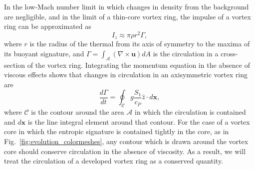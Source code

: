 \documentclass[twocolumn, amsmath, amsfonts, amssymb, trackchanges]{aastex62}
\newcommand{\grad}{\ensuremath{\nabla}}
\begin{document}
In the low-Mach number limit in which changes in density from the background are negligible, and in the limit of a thin-core vortex ring, the impulse of a vortex ring can be approximated as
\begin{equation}
I_z \approx \pi \rho r^2 \Gamma,
\label{eqn:impulse_approx}
\end{equation}
where $r$ is the radius of the thermal from its axis of symmetry to the maxima of its buoyant signature, and $\Gamma = \int_{\mathcal{A}} (\grad\times\bm{u})dA$ is the circulation in a cross-section of the vortex ring.
Integrating the momentum equation in the absence of viscous effects shows that changes in circulation in an axisymmetric vortex ring are
\begin{equation}
\frac{d\Gamma}{dt} = \oint_{\mathcal{C}} g \frac{S_1}{c_P}\hat{z} \cdot d\bm{x},
\label{eqn:circulation}
\end{equation}
where $\mathcal{C}$ is the contour around the area $\mathcal{A}$ in which the circulation is contained and $d\bm{x}$ is the line integral element around that contour.
For the case of a vortex core in which the entropic signature is contained tightly in the core, as in Fig.~\ref{fig:evolution_colormeshes}, any contour which is drawn around the vortex core should conserve circulation in the absence of viscosity.
As a result, we will treat the circulation of a developed vortex ring as a conserved quantity.
\end{document}
